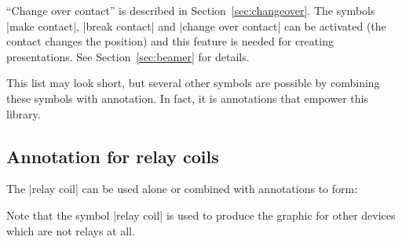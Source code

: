 \documentclass[a4paper]{ltxdoc}
\begin{document}
``Change over contact'' is described in Section~\ref{sec:changeover}. The symbols |make contact|, |break contact| and |change over contact| can be activated (the contact changes the position) and this feature is needed for creating presentations. See Section~\ref{sec:beamer} for details.

This list may look short, but several other symbols are possible by combining these symbols with annotation. In fact, it is annotations that empower this library.


\subsection{Annotation for relay coils}
\begin{minipage}{\linewidth}
The |relay coil| can be used alone or combined with annotations to form:
\begin{center}
\hspace*{-3ex}
\end{center}
\bigskip\end{minipage}
\begin{center}
\hspace*{-3ex}
\end{center}
Note that the symbol |relay coil| is used to produce the graphic for other devices which are not relays at all. 
\end{document}
